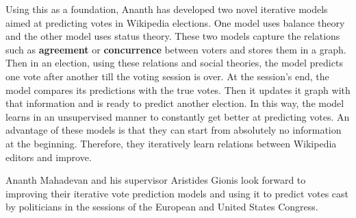\documentclass[12pt,a4paper]{article}
\begin{document}
\medskip
\noindent
Using this as a foundation, Ananth has developed two novel iterative models aimed at predicting votes in Wikipedia elections.
One model uses balance theory and the other model uses status theory.
These two models capture the relations such as \textbf{agreement} or \textbf{concurrence} between voters and stores them in a graph.
Then in an election, using these relations and social theories, the model predicts one vote after another till the voting session is over.
At the session's end, the model compares its predictions with the true votes.
Then it updates it graph with that information and is ready to predict another election.
In this way, the model learns in an unsupervised manner to constantly get better at predicting votes.
An advantage of these models is that they can start from absolutely no information at the beginning.
Therefore, they iteratively learn relations between Wikipedia editors and improve. 

\medskip
\noindent
Ananth Mahadevan and his supervisor Aristides Gionis look forward to improving their iterative vote prediction models and using it to predict votes cast by politicians in the sessions of the European and United States Congress.
\end{document}
